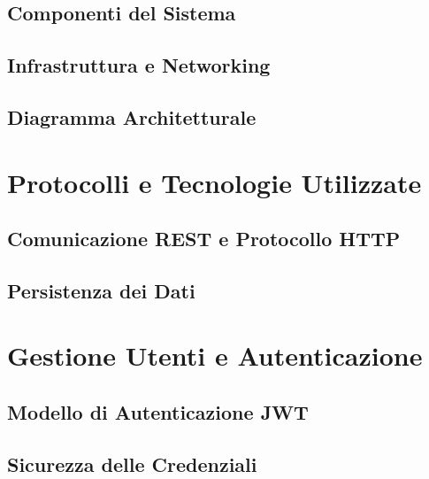 \documentclass[12pt,a4paper]{report}
\begin{document}
\section{Componenti del Sistema}

\section{Infrastruttura e Networking}

\section{Diagramma Architetturale}
% 

\chapter{Protocolli e Tecnologie Utilizzate}
\label{cap:protocolli}

\section{Comunicazione REST e Protocollo HTTP}

\section{Persistenza dei Dati}

\chapter{Gestione Utenti e Autenticazione}
\label{cap:autenticazione}

\section{Modello di Autenticazione JWT}

\section{Sicurezza delle Credenziali}
\end{document}
